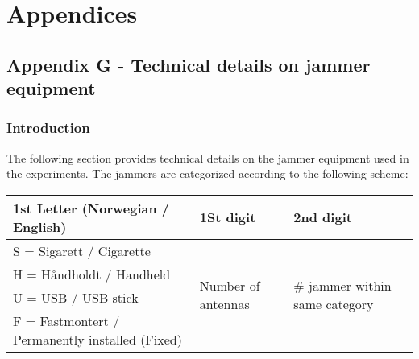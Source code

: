 \documentclass[a4paper]{book}
\begin{document}
\chapter{Appendices}
\section{Appendix G - Technical details on jammer equipment}

\subsection{Introduction}
The following section provides technical details on the jammer equipment used in the experiments. The jammers are categorized according to the following scheme:

\begin{table}[H]
\begin{tabular}{|l|l|l|}
\hline \rowcolor[HTML]{C0C0C0} 
\textbf{1st Letter (Norwegian / English)}    & \textbf{1St digit}                             & \textbf{2nd digit}                     \\
\hline
S = Sigarett / Cigarette            & \multirow{4}{*}{Number of antennas}   & \multirow{4}{*}{\# jammer within same category} \\
\cline{1-1}
H = Håndholdt / Handheld            &                                       &                        \\
\cline{1-1}
U = USB / USB stick                 &                                       &                        \\
\cline{1-1}
F = Fastmontert / Permanently installed (Fixed) &                                       &         \\
\hline              
\end{tabular}
\end{table}
\end{document}
